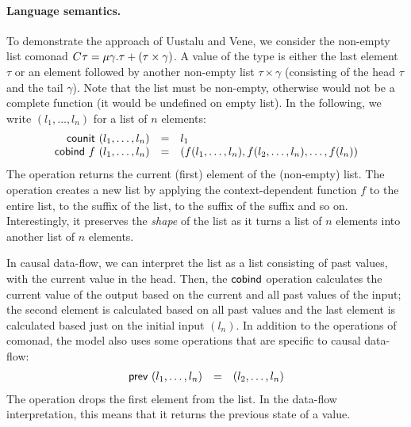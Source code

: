 \paragraph{Language semantics.}
To demonstrate the approach of Uustalu and Vene, we consider the non-empty list comonad
$C^{}\tau = \mu \gamma.\tau + (\tau \times \gamma)$. A value of the type is either
the last element $\tau$ or an element followed by another non-empty list $\tau \times \gamma$
(consisting of the head $\tau$ and the tail $\gamma$). Note that the list must be non-empty, 
otherwise  would not be a complete function (it would be undefined on empty list). In 
the following, we write $(l_1, \ldots, l_n)$ for a list of $n$ elements:
%
\begin{equation*}
\begin{array}{rcl}
\textnormal{\sffamily counit}~(l_1, \ldots, l_n) &=& l_1\\
\textnormal{\sffamily cobind}~f~(l_1, \ldots, l_n) &=& (f (l_1, \ldots, l_n), f (l_2, \ldots, l_n), \ldots, f (l_n))
\end{array}
\end{equation*}
%
The  operation returns the current (first) element of the (non-empty) list.
The  operation creates a new list by applying the context-dependent function $f$
to the entire list, to the suffix of the list, to the suffix of the suffix and so on. Interestingly,
it preserves the \emph{shape} of the list as it turns a list of $n$ elements into another list
of $n$ elements.

In causal data-flow, we can interpret the list as a list consisting of past values, with the 
current value in the head. Then, the $\textnormal{\sffamily cobind}$ operation calculates the current value
of the output based on the current and all past values of the input; the second element is
calculated based on all past values and the last element is calculated based just on the initial
input $(l_n)$. In addition to the operations of comonad, the model also uses some operations that
are specific to causal data-flow:
%
\begin{equation*}
\begin{array}{rcl}
\textnormal{\sffamily prev}~(l_1, \ldots, l_n) &=& (l_2, \ldots, l_n)\\
\end{array}
\end{equation*}
%
The operation drops the first element from the list. In the data-flow interpretation, this means
that it returns the previous state of a value. 

